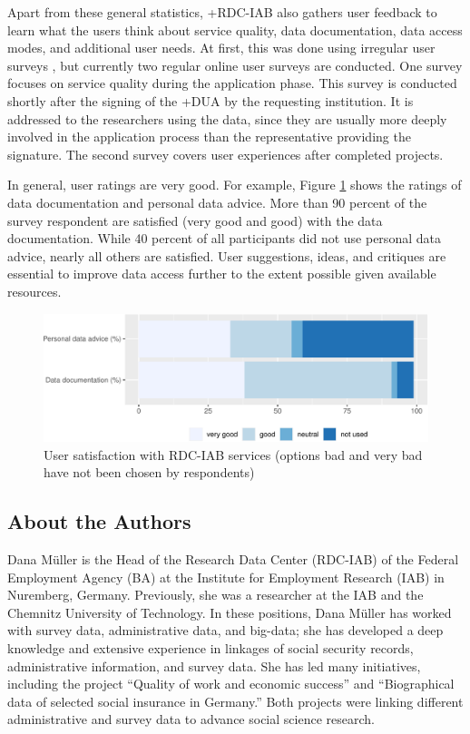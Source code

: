 \documentclass[
]{WileySix}
\begin{document}
Apart from these general statistics, +RDC-IAB\textbar{} also gathers user feedback to learn what the users think about service quality, data documentation, data access modes, and additional user needs. At first, this was done using irregular user surveys \citep{wolter2018}, but currently two regular online user surveys are conducted. One survey focuses on service quality during the application phase. This survey is conducted shortly after the signing of the +DUA\textbar{} by the requesting institution. It is addressed to the researchers using the data, since they are usually more deeply involved in the application process than the representative providing the signature. The second survey covers user experiences after completed projects.

In general, user ratings are very good. For example, Figure \ref{fig:iabfig4} shows the ratings of data documentation and personal data advice. More than 90 percent of the survey respondent are satisfied (very good and good) with the data documentation. While 40 percent of all participants did not use personal data advice, nearly all others are satisfied. User suggestions, ideas, and critiques are essential to improve data access further to the extent possible given available resources.

\begin{figure}
\centering
\includegraphics{figures/iabfig4-1.pdf}
\caption{\label{fig:iabfig4}User satisfaction with RDC-IAB services (options bad and very bad have not been chosen by respondents)}
\end{figure}

\hypertarget{about-the-authors-1}{%
\subsection*{About the Authors}\label{about-the-authors-1}}

Dana Müller is the Head of the Research Data Center (RDC-IAB) of the Federal Employment Agency (BA) at the Institute for Employment Research (IAB) in Nuremberg, Germany. Previously, she was a researcher at the IAB and the Chemnitz University of Technology. In these positions, Dana Müller has worked with survey data, administrative data, and big-data; she has developed a deep knowledge and extensive experience in linkages of social security records, administrative information, and survey data. She has led many initiatives, including the project ``Quality of work and economic success'' and ``Biographical data of selected social insurance in Germany.'' Both projects were linking different administrative and survey data to advance social science research.
\end{document}

